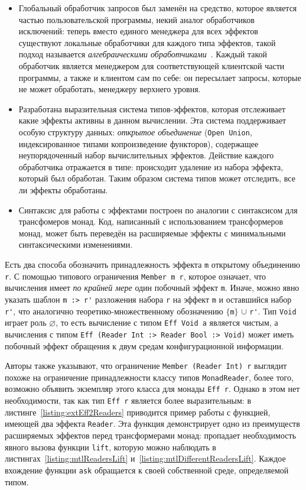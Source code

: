 \begin{itemize}
  \item
Глобальный обработчик запросов был заменён на средство, которое является частью
пользовательской программы, некий аналог обработчиков исключений: теперь вместо
единого менеджера для всех эффектов существуют локальные обработчики для каждого
типа эффектов, такой подход называется \emph{алгебраическими
обработчиками}~\cite{effAndHandl}. Каждый такой обработчик является менеджером
для соответствующей клиентской части программы, а также и клиентом сам по себе:
он пересылает запросы, которые не может обработать, менеджеру верхнего уровня.
  \item
Разработана выразительная система типов-эффектов, которая отслеживает какие
эффекты активны в данном вычислении. Эта система поддерживает особую структуру
данных: \emph{открытое объединение} (\lstinline{Open Union}, индексированное
типами копроизведение функторов), содержащее неупорядоченный набор
вычислительных эффектов. Действие каждого обработчика отражается в типе:
происходит удаление из набора эффекта, который был обработан. Таким
образом система типов может отследить, все ли эффекты обработаны.
  \item
Синтаксис для работы с эффектами построен по аналогии с синтаксисом для
трансфомеров монад. Код, написанный с использованием трансформеров монад,
может быть переведён на расширяемые эффекты с минимальными синтаксическими
изменениями.
\end{itemize}

Есть два способа обозначить принадлежность эффекта \lstinline{m} открытому
объединению \lstinline{r}. С помощью типового ограничения
\mbox{\lstinline{Member m r},} которое означает, что вычисления имеет
\emph{по крайней мере} один побочный эффект \lstinline{m}. Иначе, можно явно
указать шаблон \lstinline{m :> r'} разложения набора \lstinline{r} на
эффект \lstinline{m} и оставшийся набор \lstinline{r'}, что аналогично
теоретико-множественному обозначению $\{$\lstinline{m}$\}$ $\cup$
\lstinline{r'}. Тип \lstinline{Void} играет роль $\varnothing$, то есть
вычисление с типом \lstinline{Eff Void a} является чистым, а вычисления с
типом \lstinline{Eff (Reader Int :> Reader Bool :> Void)} может иметь побочный
эффект обращения к двум средам конфигурационной информации.

Авторы также указывают, что ограничение
\mbox{\lstinline{Member (Reader Int) r}} выглядит похоже на ограничение
принадлежности классу типов \lstinline{MonadReader}, более того, возможно
объявить экземпляр этого класса для монады \lstinline{Eff r}. Однако в этом нет
необходимости, так как тип \lstinline{Eff r} является более выразительным:
в листинге~\ref{listing:extEff2Readers} приводится пример работы с функцией,
имеющей два эффекта \lstinline{Reader}. Эта функция демонстрирует одно из
преимуществ расширяемых эффектов перед трансформерами монад: пропадает
необходимость явного вызова функции \lstinline{lift}, которую можно наблюдать
в листингах~\ref{listing:mtlReadersLift}
и~\ref{listing:mtlDifferentReadersLift}. Каждое вхождение функции
\lstinline{ask} обращается к своей собственной среде, определяемой типом.

